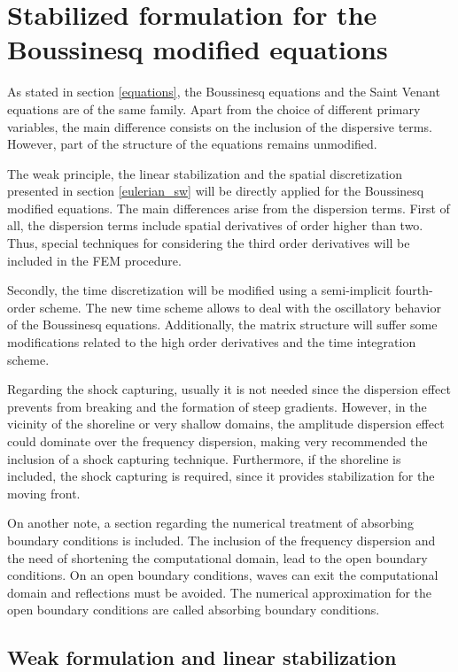 \section{Stabilized formulation for the Boussinesq modified equations}



As stated in section \ref{equations}, the Boussinesq equations and the Saint Venant equations are of the same family. Apart from the choice of different primary variables, the main difference consists on the inclusion of the dispersive terms. However, part of the structure of the equations remains unmodified.

The weak principle, the linear stabilization and the spatial discretization presented in section \ref{eulerian_sw} will be directly applied for the Boussinesq modified equations. The main differences arise from the dispersion terms.
First of all, the dispersion terms include spatial derivatives of order higher than two. Thus, special techniques for considering the third order derivatives will be included in the FEM procedure.

Secondly, the time discretization will be modified using a semi-implicit fourth-order scheme. The new time scheme allows to deal with the oscillatory behavior of the Boussinesq equations.
Additionally, the matrix structure will suffer some modifications related to the high order derivatives and the time integration scheme.

Regarding the shock capturing, usually it is not needed since the dispersion effect prevents from breaking and the formation of steep gradients. However, in the vicinity of the shoreline or very shallow domains, the amplitude dispersion effect could dominate over the frequency dispersion, making very recommended the inclusion of a shock capturing technique. Furthermore, if the shoreline is included, the shock capturing is required, since it provides stabilization for the moving front.

On another note, a section regarding the numerical treatment of absorbing boundary conditions is included. The inclusion of the frequency dispersion and the need of shortening the computational domain, lead to the open boundary conditions. On an open boundary conditions, waves can exit the computational domain and reflections must be avoided. The numerical approximation for the open boundary conditions are called absorbing boundary conditions.




\subsection{Weak formulation and linear stabilization}


